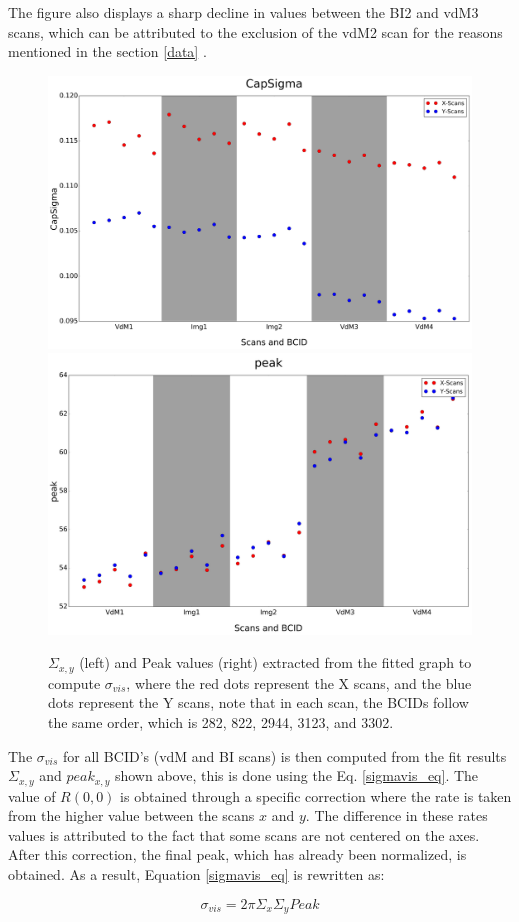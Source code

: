 The figure also displays a sharp decline in values between the BI2 and vdM3 scans, which can be attributed to the exclusion of the vdM2 scan for the reasons mentioned in the section \ref{data} . 

\begin{center}
  \begin{figure}[h!]
    \centering
    \includegraphics[width=.49\textwidth]{Chapter4/DGConst_CapSigma.png}
    \includegraphics[width=.48\textwidth]{Chapter4/DGConst_peak.png}
    \caption[$\Sigma_{x,y}$ and peak values for all scan pairs]{$\Sigma_{x,y}$ (left) and Peak values (right) extracted from the fitted graph to compute $\sigma_{vis}$, where the red dots represent the X scans, and the blue dots represent the Y scans, note that in each scan, the BCIDs follow the same order, which is 282, 822, 2944, 3123, and 3302.} 
    \label{capsigma_peak}
  \end{figure}
\end{center}

The $\sigma_{vis}$ for all BCID's (vdM and BI scans) is then computed from the fit results $\Sigma_{x,y}$ and $peak_{x,y}$ shown above, this is done using the Eq. \ref{sigmavis_eq}. The value of $R(0,0)$ is obtained through a specific correction where the rate is taken from the higher value between the scans $x$ and $y$. The difference in these rates values is attributed to the fact that some scans are not centered on the axes. After this correction, the final peak, which has already been normalized, is obtained. As a result, Equation \ref{sigmavis_eq} is rewritten as:

\begin{equation}
 \sigma_{vis}= 2\pi \Sigma_{x} \Sigma_{y}Peak
 \end{equation}

